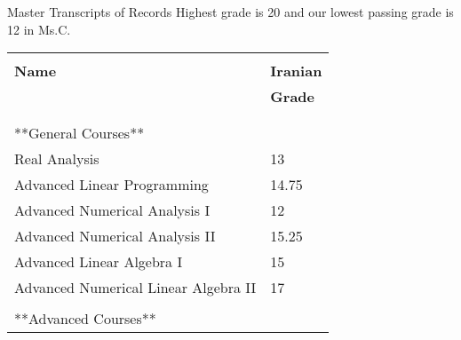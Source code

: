 \begin{cSection}{Master Transcripts of Records}
Highest grade is 20 and our lowest passing grade is 12 in Ms.C.\\
	\begin{tabular}{ @{} >{}l l }%
		&\\%
		\textbf{Name} & \textbf{Iranian} \\%
		& \textbf{Grade} \\%
		\\\cline{1-2}\\
	
		**General Courses** & \\%
		Real Analysis & 13 \\%
		Advanced Linear Programming & 14.75 \\%
	
		Advanced Numerical Analysis I & 12 \\%
		Advanced Numerical Analysis II & 15.25 \\%
	
		Advanced Linear Algebra I & 15 \\%
		Advanced Numerical Linear Algebra II& 17 \\%
	
		\cline{1-2}\\
		**Advanced Courses**&\\%
	

\end{tabular}
\end{cSection}
